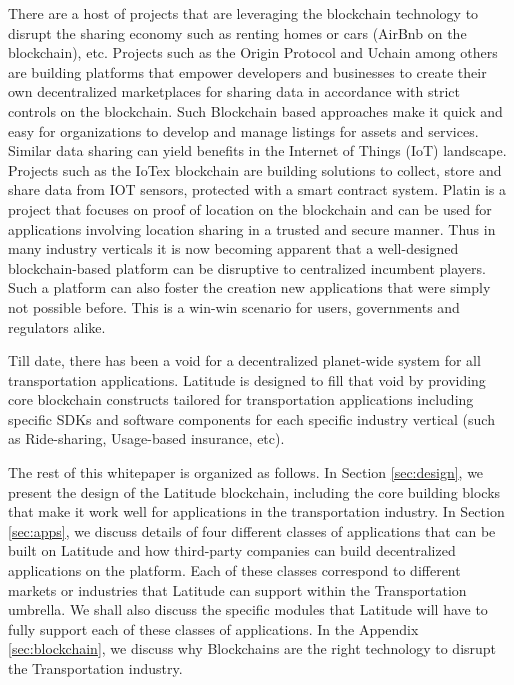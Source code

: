 There are a host of projects that are leveraging the blockchain technology to disrupt the sharing economy such as
renting homes or cars (AirBnb on the blockchain), etc. Projects such as the Origin Protocol and Uchain among others are
building platforms that empower developers and businesses to create their own decentralized marketplaces for sharing
data in accordance with strict controls on the blockchain.  Such Blockchain based approaches make it quick and easy for
organizations to develop and manage listings for assets and services. Similar data sharing can yield benefits in the
Internet of Things (IoT) landscape. Projects such as the IoTex blockchain are building solutions to collect, store and
share data from IOT sensors, protected with a smart contract system.  Platin \cite{platin} is a project that focuses on
proof of location on the blockchain and can be used for applications involving location sharing in a trusted and secure
manner. Thus in many industry verticals it is now becoming apparent that a well-designed blockchain-based platform can
be disruptive to centralized incumbent players. Such a platform can also foster the creation new applications that were
simply not possible before. This is a win-win scenario for users, governments and regulators alike.

Till date, there has been a void for a decentralized planet-wide system for all transportation applications. Latitude is
designed to fill that void by providing core blockchain constructs tailored for transportation applications including
specific SDKs and software components for each specific industry vertical (such as Ride-sharing, Usage-based insurance,
etc).

The rest of this whitepaper is organized as follows.  In Section \ref{sec:design}, we present the design of the Latitude
blockchain, including the core building blocks that make it work well for applications in the transportation industry.
In Section \ref{sec:apps}, we discuss details of four different classes of applications that can be built on Latitude
and how third-party companies can build decentralized applications on the platform. Each of these classes correspond to
different markets or industries that Latitude can support within the Transportation umbrella. We shall also discuss the
specific modules that Latitude will have to fully support each of these classes of applications. In the Appendix
\ref{sec:blockchain}, we discuss why Blockchains are the right technology to disrupt the Transportation industry.

